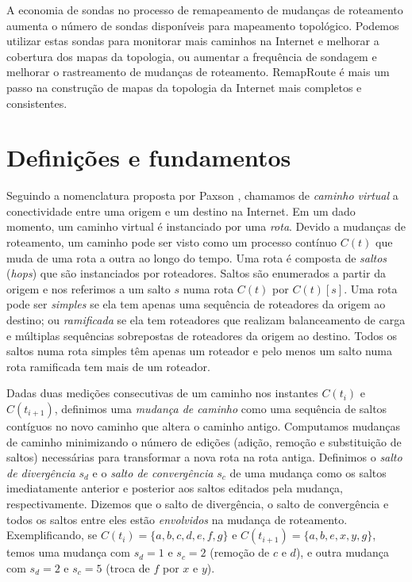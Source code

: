\documentclass{JBCS}
\newcommand{\rmprt}{{Re\-map\-Rou\-te}}
\begin{document}
A economia de sondas no processo de remapeamento de mudanças de
roteamento aumenta o número de sondas disponíveis para mapeamento
topológico.  Podemos utilizar estas sondas para monitorar mais caminhos
na Internet e melhorar a cobertura dos mapas da topologia, ou aumentar a
frequência de sondagem e melhorar o rastreamento de mudanças de
roteamento.  \rmprt{} é mais um passo na construção de mapas da
topologia da Internet mais completos e consistentes.

\section{Definições e fundamentos}
\label{sec:background}

Seguindo a nomenclatura proposta por Paxson \cite{paxson97routing},
chamamos de \emph{caminho virtual} a conectividade entre uma origem e um
destino na Internet.  Em um dado momento, um caminho virtual é
instanciado por uma \emph{rota}.  Devido a mudanças de roteamento, um
caminho pode ser visto como um processo contínuo $C(t)$ que muda de uma
rota a outra ao longo do tempo.  Uma rota é composta de \emph{saltos}
(\emph{hops}) que são instanciados por roteadores.  Saltos são
enumerados a partir da origem e nos referimos a um salto $s$ numa rota
$C(t)$ por $C(t)[s]$.  Uma rota pode ser \emph{simples} se ela tem
apenas uma sequência de roteadores da origem ao destino; ou
\emph{ramificada} se ela tem roteadores que realizam balanceamento de
carga e múltiplas sequências sobrepostas de roteadores da origem ao
destino.  Todos os saltos numa rota simples têm apenas um roteador e
pelo menos um salto numa rota ramificada tem mais de um roteador.

Dadas duas medições consecutivas de um caminho nos instantes $C(t_i)$ e
$C(t_{i+1})$, definimos uma \emph{mudança de caminho} como uma sequência
de saltos contíguos no novo caminho que altera o caminho antigo.
Computamos mudanças de caminho minimizando o número de edições (adição,
remoção e substituição de saltos) necessárias para transformar a nova
rota na rota antiga.  Definimos o \emph{salto de divergência} $s_d$ e o
\emph{salto de convergência} $s_c$ de uma mudança como os saltos
imediatamente anterior e posterior aos saltos editados pela mudança,
respectivamente.  Dizemos que o salto de divergência, o salto de
convergência e todos os saltos entre eles estão \emph{envolvidos} na
mudança de roteamento.  Exemplificando, se $C(t_i) = \{a, b, c, d, e, f,
g\}$ e $C(t_{i+1}) = \{a, b, e, x, y, g\}$, temos uma mudança com $s_d =
1$ e $s_c = 2$ (remoção de $c$ e $d$), e outra mudança com $s_d = 2$ e
$s_c = 5$ (troca de $f$ por $x$ e $y$).
\end{document}
